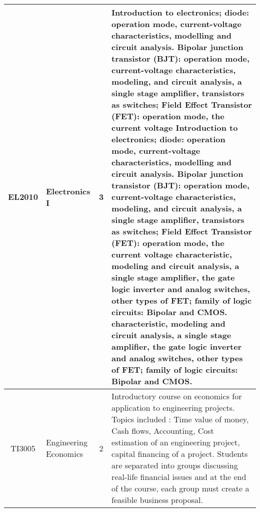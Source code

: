 \documentclass{article}
\begin{document}
\begin{center}
\begin{tabular}{ | c | B{5.4cm} | c | p{6.8cm} |}
            EL2010 & Electronics I & 3 & Introduction to electronics; diode: operation mode, current-voltage characteristics, modelling and circuit analysis. Bipolar junction transistor (BJT): operation mode, current-voltage characteristics, modeling, and circuit analysis, a single stage amplifier, transistors as switches; Field Effect Transistor (FET): operation mode, the current voltage Introduction to electronics; diode: operation mode, current-voltage characteristics, modelling and circuit analysis. Bipolar junction transistor (BJT): operation mode, current-voltage characteristics, modeling, and circuit analysis, a single stage amplifier, transistors as switches; Field Effect Transistor (FET): operation mode, the current voltage characteristic, modeling and circuit analysis, a single stage amplifier, the gate logic inverter and analog switches, other types of FET; family of logic circuits: Bipolar and CMOS. characteristic, modeling and circuit analysis, a single stage amplifier, the gate logic inverter and analog switches, other types of FET; family of logic circuits: Bipolar and CMOS. \\ \hline                                   
       
            TI3005 & Engineering Economics & 2 & Introductory course on economics for application to engineering projects. Topics included : Time value of money, Cash flows, Accounting, Cost estimation of an engineering project, capital financing of a project. Students are separated into groups discussing real-life financial issues and at the end of the course, each group must create a feasible business proposal.  \\ \hline                                                      
                               
        \end{tabular}
    \end{center}   
    
    \newpage
    
\end{document}
